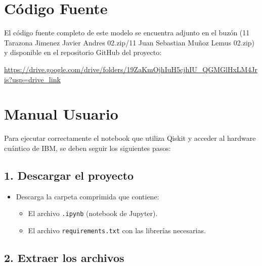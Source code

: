 \documentclass{article}
\begin{document}

\section{Código Fuente}\label{sec:cod}

El código fuente completo de este modelo se encuentra adjunto en el buzón 
(11 Tarazona Jimenez Javier Andres 02.zip/11 Juan Sebastian Muñoz Lemus 02.zip)
y disponible en el repositorio GitHub del proyecto:

\begin{center}
\url{https://drive.google.com/drive/folders/19ZaKmOjhIuH5cjhIU_QGMGlHxLM4Jris?usp=drive_link}
\end{center}


\section{Manual Usuario}\label{sec:man_u}

Para ejecutar correctamente el notebook que utiliza Qiskit y acceder al hardware cuántico de IBM, 
se deben seguir los siguientes pasos:

\subsection*{1. Descargar el proyecto}

\begin{itemize}
    \item Descarga la carpeta comprimida que contiene:
    \begin{itemize}
        \item El archivo \texttt{.ipynb} (notebook de Jupyter).
        \item El archivo \texttt{requirements.txt} con las librerías necesarias.
    \end{itemize}
\end{itemize}

\subsection*{2. Extraer los archivos}
\end{document}

